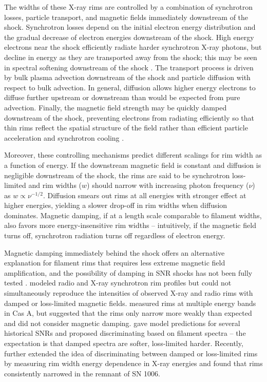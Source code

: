 \documentclass[manuscript]{aastex}  %
\begin{document}
The widths of these X-ray rims are controlled by a combination of
synchrotron losses, particle transport, and magnetic fields immediately
downstream of the shock.  Synchrotron losses depend on the initial electron
energy distribution and the gradual decrease of electron energies downstream of
the shock.  High energy electrons near the shock efficiently radiate harder
synchrotron X-ray photons, but decline in energy as they are transported away
from the shock; this may be seen in spectral softening downstream of the shock
\citep[e.g.,][]{cassam-chenai2007}.  The transport process is driven by bulk
plasma advection downstream of the shock and particle diffusion with respect to
bulk advection.  In general, diffusion allows higher energy electrons to
diffuse further upstream or downstream than would be expected from pure
advection.  Finally, the magnetic field strength may be quickly damped
downstream of the shock, preventing electrons from radiating efficiently so
that thin rims reflect the spatial structure of the field rather than efficient
particle acceleration and synchrotron cooling \citep{pohl2005}.

Moreover, these controlling mechanisms predict different scalings for rim width
as a function of energy.  If the downstream magnetic field is constant and
diffusion is negligible downstream of the shock, the rims are said to be
synchrotron loss-limited and rim widths ($w$) should narrow with increasing
photon frequency ($\nu$) as $w \propto \nu^{-1/2}$. Diffusion smears out rims
at all energies with stronger effect at higher energies, yielding a slower
drop-off in rim widths when diffusion dominates.  Magnetic damping, if at a
length scale comparable to filament widths, also favors more energy-insensitive
rim widths -- intuitively, if the magnetic field turns off, synchrotron
radiation turns off regardless of electron energy.

Magnetic damping immediately behind the shock offers an alternative explanation
for filament rims that requires less extreme magnetic field amplification, and
the possibility of damping in SNR shocks has not been fully tested
\citep{pohl2005, marcowith2010}.  \citet{cassam-chenai2007} modeled radio and
X-ray synchrotron rim profiles but could not simultaneously reproduce the
intensities of observed X-ray and radio rims with damped or loss-limited
magnetic fields.  \citet{araya2010} measured rims at multiple energy bands in
Cas A, but suggested that the rims only narrow more weakly than expected and
did not consider magnetic damping.  \citet{rettig2012} gave model predictions
for several historical SNRs and proposed discriminating based on filament
spectra -- the expectation is that damped spectra are softer, loss-limited
harder.  Recently, \citet{ressler2014} further extended the idea of
discriminating between damped or loss-limited rims by measuring rim width
energy dependence in X-ray energies and found that rims consistently narrowed
in the remnant of SN 1006.
\end{document}
